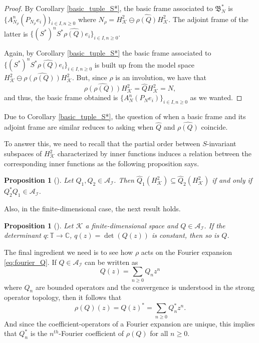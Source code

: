 \documentclass[a4paper,12pt]{amsart}
\def\cA{{\mathcal{A}}}
\def\C{{\mathbb{C}}}
\def\cI{{\mathcal{I}}}
\def\KK{{\mathcal{K}}}
\def\T{{\mathbb{T}}}
\newtheorem{proposition}[theorem]{Proposition}
\theoremstyle{definition}
\begin{document}
\begin{proof}
By Corollary \ref{basic_tuple_S*}, the basic frame associated to $\mathfrak{B}_{N}^*$ is $\{A_{N_{\rho}}^n(P_{N_{\rho}}e_i)\}_{i\in I,n\geqslant0}$
where $N_{\rho} = H^2_\KK\ominus\widehat{\rho(Q)}H^2_\KK$. The adjoint frame of the latter is $\{(S^*)^nS^*\widehat{\rho(Q)}e_i\}_{i\in I,n\geqslant0}$.

Again, by Corollary \ref{basic_tuple_S*} the basic frame associated to $\{(S^*)^nS^*\widehat{\rho(Q)}e_i\}_{i\in I,n\geqslant0}$ is built up from the model space $H^2_\KK\ominus\widehat{\rho(\rho(Q))}H^2_\KK$. But, since $\rho$ is an involution, we have that 
\begin{equation*}
\widehat{\rho(\rho(Q))}H^2_\KK=\widehat{Q} H^2_\KK=N, 
\end{equation*}
and thus, the basic frame obtained is $\{A_N^n(P_Ne_i)\}_{i\in I,n\geqslant0}$ as we wanted.
\end{proof}

Due to Corollary \ref{basic_tuple_S*}, the question of when a basic frame and its adjoint frame are similar reduces to asking when $\widehat{Q}$ and $\widehat{\rho(Q)}$ coincide.

To answer this, we need to recall that the partial order between $S$-invariant subspaces of $H^2_\KK$ characterized by inner functions induces a relation between the corresponding inner functions as the following proposition says.

\begin{proposition}[{\cite[Theorem 10]{H}}]\label{inclusion_inner}
Let $Q_1,Q_2\in\cA_\cI$. Then $\widehat{Q}_{1}(H^2_\KK)\subseteq\widehat{Q}_2(H^2_\KK)$ if and only if $Q_2^*Q_1\in\cA_\cI$.
\end{proposition}

Also, in the finite-dimensional case, the next result holds.

\begin{proposition}[{\cite[Corollary of Theorem 11]{H}}]\label{det_const}
Let $\KK$ a finite-dimensional space and $Q\in\cA_\cI$. If the determinant $q:\T\to\C$, $q(z)=\det(Q(z))$ is constant, then so is $Q$. 
\end{proposition}

The final ingredient we need is to see how $\rho$ acts on the Fourier expansion \eqref{eq:fourier_Q}. If $Q\in\cA_\cI$ can be written as
\begin{equation*}
Q(z)=\sum_{n\geqslant0}Q_nz^n
\end{equation*}
where $Q_n$ are bounded operators and the convergence is understood in the strong operator topology, then it follows that
\begin{equation*}
\rho(Q)(z)=Q(\overline{z})^*=\sum_{n\geqslant0}Q_n^*z^n.
\end{equation*}
And since the coefficient-operators of a Fourier expansion are unique, this implies that $Q_n^*$ is the $n^{th}$-Fourier coefficient of $\rho(Q)$ for all $n\geqslant0$.
\end{document}
